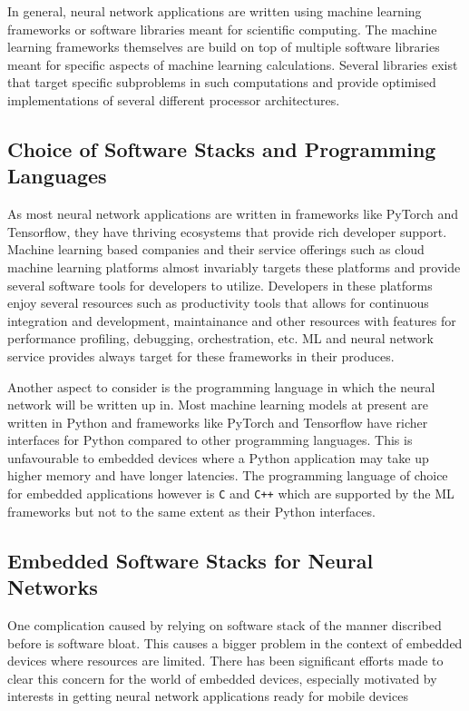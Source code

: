 In general, neural network applications are written using machine learning frameworks or software libraries meant for scientific computing. The machine learning frameworks themselves are build on top of multiple software libraries meant for specific aspects of machine learning calculations. Several libraries exist that target specific subproblems in such computations and provide optimised implementations of several different processor architectures.

\subsection{Choice of Software Stacks and Programming Languages}

As most neural network applications are written in frameworks like PyTorch and Tensorflow, they have thriving ecosystems that provide rich developer support. Machine learning based companies and their service offerings such as cloud machine learning platforms almost invariably targets these platforms and provide several software tools for developers to utilize. Developers in these platforms enjoy several resources such as productivity tools that allows for continuous integration and development, maintainance and other resources with features for performance profiling, debugging, orchestration, etc. ML and neural network service provides always target for these frameworks in their produces.

Another aspect to consider is the programming language in which the neural network will be written up in. Most machine learning models at present are written in Python and frameworks like PyTorch and Tensorflow have richer interfaces for Python compared to other programming languages. This is unfavourable to embedded devices where a Python application may take up higher memory and have longer latencies. The programming language of choice for embedded applications however is \verb!C! and \verb!C++! which are supported by the ML frameworks but not to the same extent as their Python interfaces.

\subsection{Embedded Software Stacks for Neural Networks}

One complication caused by relying on software stack of the manner discribed before is software bloat. This causes a bigger problem in the context of embedded devices where resources are limited. There has been significant efforts made to clear this concern for the world of embedded devices, especially motivated by interests in getting neural network applications ready for mobile devices


